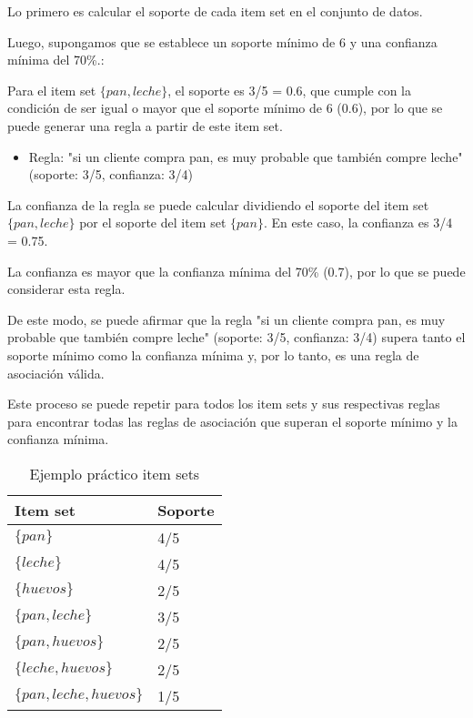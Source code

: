 Lo primero es calcular el soporte de cada item set en el conjunto de datos.

Luego, supongamos que se establece un soporte mínimo de 6 y una confianza mínima del 70\%.:

Para el item set $\{pan, leche\}$, el soporte es 3/5 = 0.6, que cumple con la condición de ser igual o mayor que el soporte mínimo de 6 (0.6), por lo que se puede generar una regla a partir de este item set.

\begin{itemize}
    \item Regla: "si un cliente compra pan, es muy probable que también compre leche" (soporte: 3/5, confianza: 3/4)
\end{itemize}

La confianza de la regla se puede calcular dividiendo el soporte del item set $\{pan, leche\}$ por el soporte del item set $\{pan\}$. En este caso, la confianza es 3/4 = 0.75.

La confianza es mayor que la confianza mínima del 70\% (0.7), por lo que se puede considerar esta regla.

De este modo, se puede afirmar que la regla "si un cliente compra pan, es muy probable que también compre leche" (soporte: 3/5, confianza: 3/4) supera tanto el soporte mínimo como la confianza mínima y, por lo tanto, es una regla de asociación válida.

Este proceso se puede repetir para todos los item sets y sus respectivas reglas para encontrar todas las reglas de asociación que superan el soporte mínimo y la confianza mínima.

\begin{table}[h]
	\centering
	\begin{tabularx}{\linewidth}{X p{}}
		\toprule
		\textbf{Item set} & \textbf{Soporte} \\
		\toprule
		$\{pan\}$ & 4/5 \\
		$\{leche\}$ & 4/5 \\
		$\{huevos\}$ & 2/5 \\
		$\{pan, leche\}$ & 3/5 \\
		$\{pan, huevos\}$ & 2/5 \\
        $\{leche, huevos\}$ & 2/5 \\
        $\{pan, leche, huevos\}$ & 1/5 \\
		\bottomrule
	\end{tabularx}
	\caption{Ejemplo práctico item sets}
\end{table}